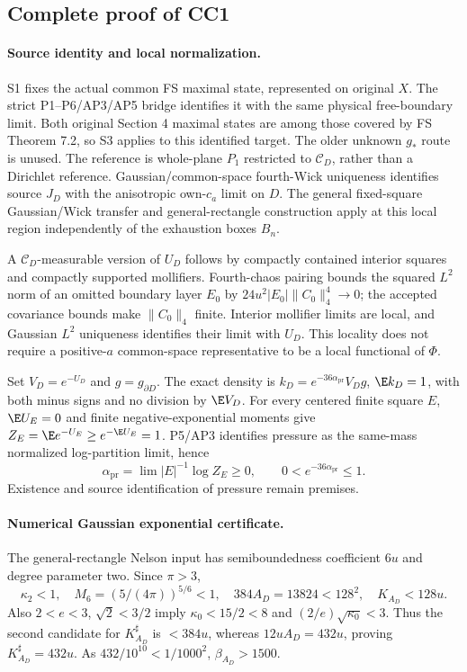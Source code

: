 \subsection{Complete proof of CC1}
\paragraph{Source identity and local normalization.}
S1 fixes the actual common FS maximal state, represented on original $X$.
The strict P1--P6/AP3/AP5 bridge identifies it with the same physical
free-boundary limit. Both original Section 4 maximal states are among those
covered by FS Theorem 7.2, so S3 applies to this identified target. The older
unknown $g_*$ route is unused. The reference is whole-plane $P_1$ restricted
to $\mathcal C_D$, rather than a Dirichlet reference. Gaussian/common-space
fourth-Wick uniqueness identifies source $J_D$ with the anisotropic
own-$c_a$ limit on $D$. The general fixed-square Gaussian/Wick transfer
and general-rectangle construction apply at this local region independently
of the exhaustion boxes $B_n$.

A $\mathcal C_D$-measurable version of $U_D$ follows by compactly contained
interior squares and compactly supported mollifiers. Fourth-chaos pairing
bounds the squared $L^2$ norm of an omitted boundary layer $E_0$ by
$24u^2|E_0|\|C_0\|_4^4\to0$; the accepted covariance bounds make
$\|C_0\|_4$ finite. Interior mollifier limits are local, and Gaussian $L^2$
uniqueness identifies their limit with $U_D$. This locality does not require
a positive-$a$ common-space representative to be a local functional of $\Phi$.

Set $V_D=e^{-U_D}$ and $g=g_{\partial D}$. The exact density is
$k_D=e^{-36\alpha_{\mathrm{pr}}}V_Dg$, $\E k_D=1$, with both minus signs
and no division by $\E V_D$. For every centered finite square $E$,
$\E U_E=0$ and finite negative-exponential moments give
$Z_E=\E e^{-U_E}\ge e^{-\E U_E}=1$. P5/AP3 identifies pressure as the
same-mass normalized log-partition limit, hence
\[
 \alpha_{\mathrm{pr}}=\lim|E|^{-1}\log Z_E\ge0,\qquad
 0<e^{-36\alpha_{\mathrm{pr}}}\le1.
\]
Existence and source identification of pressure remain premises.

\paragraph{Numerical Gaussian exponential certificate.}
The general-rectangle Nelson input has semiboundedness coefficient $6u$
and degree parameter two. Since $\pi>3$,
\[
 \kappa_2<1,\quad
 M_6=(5/(4\pi))^{5/6}<1,\quad384A_D=13824<128^2,
 \quad K_{A_D}<128u.
\]
Also $2<e<3$, $\sqrt2<3/2$ imply $\kappa_0<15/2<8$ and
$(2/e)\sqrt{\kappa_0}<3$. Thus the second candidate for $K^\sharp_{A_D}$
is $<384u$, whereas $12uA_D=432u$, proving
$K^\sharp_{A_D}=432u$. As $432/10^{10}<1/1000^2$,
$\beta_{A_D}>1500$.

